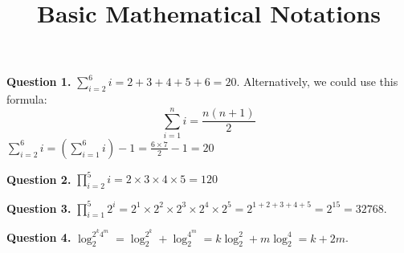 \documentclass{ximera}
\title{Basic Mathematical Notations}
\begin{document}
\maketitle

\textbf{Question 1.} $\sum_{i=2}^6 i = 2 + 3 + 4 + 5 + 6 = 20$. Alternatively, we could use this formula:
\begin{equation*}
\sum_{i=1}^n i = \frac{n(n+1)}{2}
\end{equation*}
$\sum_{i=2}^6 i = \left(\sum_{i=1}^6 i\right) - 1 = \frac{6 \times 7}{2} - 1 = 20	$

\textbf{Question 2.} $\prod_{i=2}^5 i = 2 \times 3 \times 4 \times 5 = 120$

\textbf{Question 3.} $\prod_{i=1}^5 2^i = 2^1 \times 2^2 \times 2^3 \times 2^4 \times 2^5 = 2^{1 + 2 + 3 + 4 + 5} = 2^{15} = 32768$. 

\textbf{Question 4.} $\log_2^{2^k 4^m} = \log_2^{2^k} + \log_2^{4^m} = k \log_2^2 + m \log_2^4 = k + 2m$.
\end{document}

